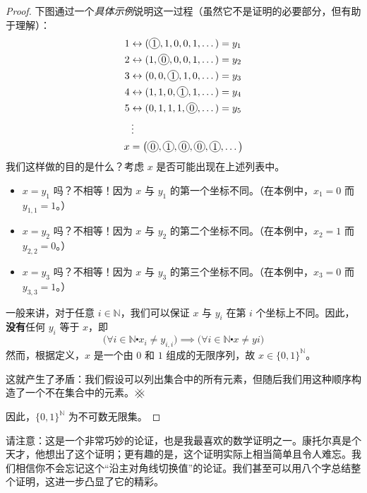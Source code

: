 \begin{proof}
    下图通过一个\emph{具体示例}说明这一过程（虽然它不是证明的必要部分，但有助于理解）：
    \begin{align*}
        1 & \leftrightarrow (\circled{1} , 1 , 0 , 0 , 1 , \dots) = y_1                        \\
        2 & \leftrightarrow (1 , \circled{0} , 0 , 0 , 1 , \dots) = y_2                        \\
        3 & \leftrightarrow (0 , 0 , \circled{1} , 1 , 0 , \dots) = y_3                        \\
        4 & \leftrightarrow (1 , 1 , 0 , \circled{1} , 1 , \dots) = y_4                        \\
        5 & \leftrightarrow (0 , 1 , 1 , 1 , \circled{0} , \dots) = y_5                        \\
          & \vdots                                                                             \\
        x & =\big(\circled{0}, \circled{1}, \circled{0}, \circled{0}, \circled{1}, \dots \big)
    \end{align*}
    我们这样做的目的是什么？考虑 $x$ 是否可能出现在上述列表中。
    \begin{itemize}
        \item $x = y_1$ 吗？不相等！因为 $x$ 与 $y_1$ 的第一个坐标不同。（在本例中，$x_1=0$ 而 $y_{1,1} = 1$。）
        \item $x = y_2$ 吗？不相等！因为 $x$ 与 $y_2$ 的第二个坐标不同。（在本例中，$x_2=1$ 而 $y_{2,2} = 0$。）
        \item $x = y_3$ 吗？不相等！因为 $x$ 与 $y_3$ 的第三个坐标不同。（在本例中，$x_3=0$ 而 $y_{3,3} = 1$。）
    \end{itemize}
    一般来讲，对于任意 $i \in \mathbb{N}$，我们可以保证 $x$ 与 $y_i$ 在第 $i$ 个坐标上不同。因此，\textbf{没有}任何 $y_i$ 等于 $x$，即
    \[\big(\forall i \in \mathbb{N} \centerdot x_i \ne y_{i,i}\big) \implies \big(\forall i \in \mathbb{N} \centerdot x \ne yi\big)\]
    然而，根据定义，$x$ 是一个由 $0$ 和 $1$ 组成的无限序列，故 $x \in \{0, 1\}^{\mathbb{N}}$。

    这就产生了矛盾：我们假设可以列出集合中的所有元素，但随后我们用这种顺序构造了一个不在集合中的元素。$\hashx$

    因此，$\{0, 1\}^{\mathbb{N}}$ 为不可数无限集。
\end{proof}

请注意：这是一个非常巧妙的论证，也是我最喜欢的数学证明之一。康托尔真是个天才，他想出了这个证明；更有趣的是，这个证明实际上相当简单且令人难忘。我们相信你不会忘记这个``沿主对角线切换值''的论证。我们甚至可以用八个字总结整个证明，这进一步凸显了它的精彩。

